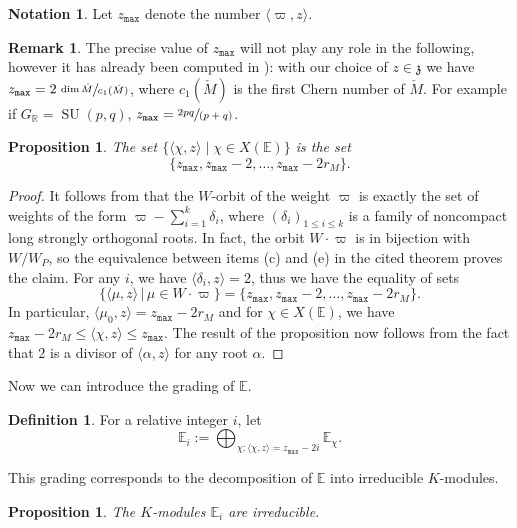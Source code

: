 \documentclass[JEP,XML,SOM,Unicode,NoFloatCountersInSection]{cedram}
\newcommand{\spfrac}[2]{\sfrac{#1}{(#2)}}
\newcommand{\citestar}[3]{\cite[#3]{#1}}
\theoremstyle{plain}
\newtheorem{prop}[theo]{Proposition}
\theoremstyle{definition}
\newtheorem{defi}[theo]{Definition}
\newtheorem{nota}[theo]{Notation}
\newtheorem{rema}[theo]{Remark}
\DeclareMathOperator{\SU}{SU}
\newcommand{\bE}{\mathbb{E}}
\newcommand{\bR}{\mathbb{R}}
\newcommand{\fz}{\mathfrak{z}}
\newcommand{\zmax}{z_{\mathtt{max}}}
\newcommand{\rkm}{{r_M}}
\newcommand{\scal}[1]{\langle #1 \rangle}
\begin{document}

\begin{nota}
Let $\zmax$ denote the number $\scal{\varpi,z}$.
\end{nota}

\begin{rema}
The precise value of $\zmax$ will not play any role in the following, however it has already
been computed in \citestar{KMgeneraltype}*{p.\,214-216}): with our choice of $z\in\fz$ we have
$\zmax=2\,\sfrac{\dim \check{M}}{c_1(\check{M})}$, where $c_1(\check{M})$ is the first Chern number
of $\check{M}$. For example if $G_\bR=\SU(p,q)$, $\zmax=\spfrac{2pq}{p+q}$.
\end{rema}

\begin{prop}
\label{prop:rang}
The set $\{\scal{\chi,z}\mid \chi \in X(\bE) \}$ is the set $$\{\zmax,\zmax-2,\ldots,\zmax-2\rkm\}.$$
\end{prop}
\begin{proof}
It follows from \citestar{richardson}*{Th.\,2.1} that the $W$-orbit of the
weight $\varpi$ is
exactly the set of weights of the form
$\varpi - \sum_{i=1}^k \delta_i$, where $(\delta_i)_{1 \leq i \leq k}$ is a family of noncompact
long strongly orthogonal roots.
In fact, the orbit $W \cdot \varpi$ is in bijection with $W/W_P$, so the equivalence between items
(c) and (e) in the cited
theorem proves the claim.
For any $i$, we have $\scal{\delta_i,z}=2 $, thus we have the equality of sets
$$\{\scal{\mu,z} \, | \, \mu \in W \cdot \varpi \} = \{ \zmax, \zmax-2, \ldots, \zmax-2\rkm \} .$$
In particular, $\scal{\mu_0,z}\!=\!\zmax-2 \rkm$ and for $\chi\!\in\!X(\bE)$, we have
\hbox{$\zmax-2\rkm\!\leq\!\scal{\chi,z} \leq \zmax$}. The result of the proposition now follows from the fact that
$2 $ is a divisor of $\scal{\alpha,z}$ for any root $\alpha$.
\end{proof}

Now we can introduce the grading of $\bE$.

\begin{defi}
\label{defi:Ei}
For a relative integer $i$, let $$\bE_i:= \bigoplus_{\chi: \scal{\chi,z} = \zmax-2 i} \bE_\chi.$$
\end{defi}

This grading corresponds to the decomposition of $\bE$ into irreducible $K$-modules.

\begin{prop}
\label{prop:Ei-irr}
The $K$-modules $\bE_i$ are irreducible.
\end{prop}
\end{document}
